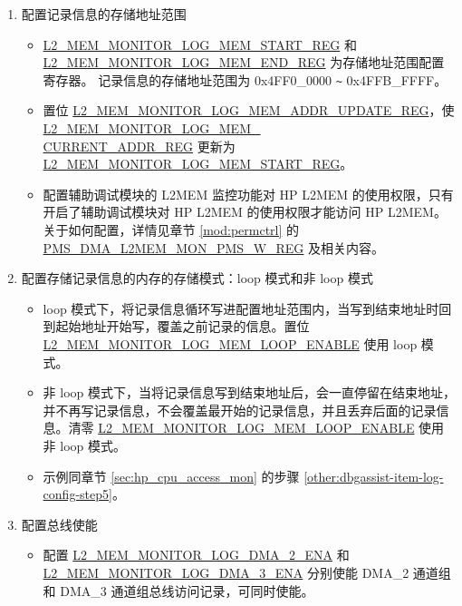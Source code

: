 \documentclass[main\_\_CN.tex]{subfiles}
\begin{document}
\begin{enumerate}
    \item 配置记录信息的存储地址范围
        \begin{itemize}
            \item \hyperref[regdesc:L2MEMMONITORLOGMEMSTARTREG]{L2\_MEM\_MONITOR\_LOG\_MEM\_START\_REG} 和 \hyperref[regdesc:L2MEMMONITORLOGMEMENDREG]{L2\_MEM\_MONITOR\_LOG\_MEM\_END\_REG} 为存储地址范围配置寄存器。 记录信息的存储地址范围为 0x4FF0\_0000 \verb+~+ 0x4FFB\_FFFF。
            \item 置位 \hyperref[regdesc:L2MEMMONITORLOGMEMADDRUPDATEREG]{L2\_MEM\_MONITOR\_LOG\_MEM\_ADDR\_UPDATE\_REG}，使 \hyperref[regdesc:L2MEMMONITORLOGMEMCURRENTADDRREG]{L2\_MEM\_MONITOR\_LOG\_MEM\_\\CURRENT\_ADDR\_REG} 更新为 \hyperref[regdesc:L2MEMMONITORLOGMEMSTARTREG]{L2\_MEM\_MONITOR\_LOG\_MEM\_START\_REG}。
            \item 配置辅助调试模块的 L2MEM 监控功能对 HP L2MEM 的使用权限，只有开启了辅助调试模块对 HP L2MEM 的使用权限才能访问 HP L2MEM。关于如何配置，详情见章节 \ref{mod:permctrl} \textit{} 的 \hyperref[regdesc:PMSDMAL2MEMMONPMSWREG]{PMS\_DMA\_L2MEM\_MON\_PMS\_W\_REG} 及相关内容。
        \end{itemize}
    \item 配置存储记录信息的内存的存储模式：loop 模式和非 loop 模式
        \begin{itemize}
            \item loop 模式下，将记录信息循环写进配置地址范围内，当写到结束地址时回到起始地址开始写，覆盖之前记录的信息。置位 \hyperref[fielddesc:L2MEMMONITORLOGMEMLOOPENABLE]{L2\_MEM\_MONITOR\_LOG\_MEM\_LOOP\_ENABLE} 使用 loop 模式。\\
            \item 非 loop 模式下，当将记录信息写到结束地址后，会一直停留在结束地址，并不再写记录信息，不会覆盖最开始的记录信息，并且丢弃后面的记录信息。清零 \hyperref[fielddesc:L2MEMMONITORLOGMEMLOOPENABLE]{L2\_MEM\_MONITOR\_LOG\_MEM\_LOOP\_ENABLE} 使用非 loop 模式。\\
            \item 示例同章节 \ref{sec:hp_cpu_access_mon} 的步骤 \ref{other:dbgassist-item-log-config-step5}。
        \end{itemize}
     \item 配置总线使能
        \begin{itemize}
            \item 配置 \hyperref[fielddesc:L2MEMMONITORLOGDMA2ENA]{L2\_MEM\_MONITOR\_LOG\_DMA\_2\_ENA} 和 \hyperref[fielddesc:L2MEMMONITORLOGDMA3ENA]{L2\_MEM\_MONITOR\_LOG\_DMA\_3\_ENA} 分别使能 DMA\_2 通道组和 DMA\_3 通道组总线访问记录，可同时使能。
        \end{itemize}
\end{enumerate}
\end{document}
